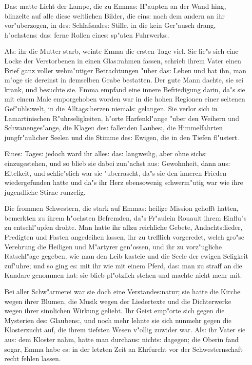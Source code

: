 \documentclass[oneside,12pt]{book}
\newcommand{\s}{s:}%
\begin{document}
Da{\s} matte Licht der Lampe, die zu Emma{\s} H"aupten an der Wand
hing, blinzelte auf alle diese weltlichen Bilder, die ein{\s} nach
dem andern an ihr vor"uberzogen, in de{\s} Schlafsaale{\s} Stille,
in die kein Ger"ausch drang, h"ochsten{\s} da{\s} ferne Rollen
eine{\s} sp"aten Fuhrwerk{\s}.

Al{\s} ihr die Mutter starb, weinte Emma die ersten Tage viel. Sie
lie"s sich eine Locke der Verstorbenen in einen Gla{\s}rahmen
fassen, schrieb ihrem Vater einen Brief ganz voller wehm"utiger
Betrachtungen "uber da{\s} Leben und bat ihn, man m"oge sie
dereinst in demselben Grabe bestatten. Der gute Mann dachte, sie
sei krank, und besuchte sie. Emma empfand eine innere Befriedigung
darin, da"s sie mit einem Male emporgehoben worden war in die
hohen Regionen einer seltenen Gef"uhl{\s}welt, in die
Alltag{\s}herzen niemal{\s} gelangen. Sie verlor sich in
Lamartinischen R"uhrseligkeiten, h"orte Harfenkl"ange "uber den
Weihern und Schwanenges"ange, die Klagen de{\s} fallenden
Laube{\s}, die Himmelfahrten jungfr"aulicher Seelen und die Stimme
de{\s} Ewigen, die in den Tiefen fl"ustert.

Eine{\s} Tage{\s} jedoch ward ihr alle{\s} da{\s} langweilig, aber
ohne sich{\s} einzugestehen, und so blieb sie dabei zun"achst
au{\s} Gewohnheit, dann au{\s} Eitelkeit, und schlie"slich war sie
"uberrascht, da"s sie den inneren Frieden wiedergefunden hatte und
da"s ihr Herz ebensowenig schwerm"utig war wie ihre jugendliche
Stirne runzelig.

Die frommen Schwestern, die stark auf Emma{\s} heilige Mission
gehofft hatten, bemerkten zu ihrem h"ochsten Befremden, da"s
Fr"aulein Rouault ihrem Einflu"s zu entschl"upfen drohte. Man
hatte ihr allzu reichliche Gebete, Andacht{\s}lieder, Predigten
und Fasten angedeihen lassen, ihr zu trefflich vorgeredet, welch
gro"se Verehrung die Heiligen und M"artyrer gen"ossen, und ihr zu
vorz"ugliche Ratschl"age gegeben, wie man den Leib kasteie und die
Seele der ewigen Seligkeit zuf"uhre; und so ging e{\s} mit ihr wie
mit einem Pferd, da{\s} man zu straff an die Kandare genommen hat:
sie blieb pl"otzlich stehen und machte nicht mehr mit.

Bei aller Schw"armerei war sie doch eine Verstande{\s}natur; sie
hatte die Kirche wegen ihrer Blumen, die Musik wegen der
Liedertexte und die Dichterwerke wegen ihrer sinnlichen Wirkung
geliebt. Ihr Geist emp"orte sich gegen die Mysterien de{\s}
Glauben{\s}, und noch mehr lehnte sie sich nunmehr gegen die
Klosterzucht auf, die ihrem tiefsten Wesen v"ollig zuwider war.
Al{\s} ihr Vater sie au{\s} dem Kloster nahm, hatte man
durchau{\s} nicht{\s} dagegen; die Oberin fand sogar, Emma habe
e{\s} in der letzten Zeit an Ehrfurcht vor der Schwesternschaft
recht fehlen lassen.
\end{document}
